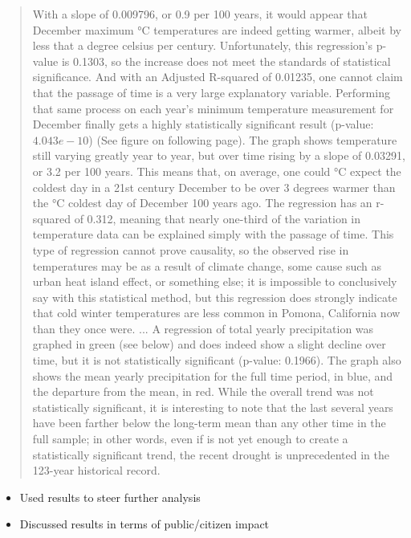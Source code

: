 \documentclass{article}\usepackage[]{graphicx}\usepackage[]{color}
\begin{document}
\begin{quote}
With a slope of 0.009796, or 0.9 per 100 years, it would appear that December maximum °C temperatures are indeed getting warmer, albeit by less that a degree celsius per century. Unfortunately, this regression’s p-value is 0.1303, so the increase does not meet the standards of statistical significance. And with an Adjusted R-squared of 0.01235, one cannot claim that the passage of time is a very large explanatory variable.
Performing that same process on each year’s minimum temperature measurement for December finally gets a highly statistically significant result (p-value: $4.043e-10$) (See figure on following page). The graph shows temperature still varying greatly year to year, but over time rising by a slope of 0.03291, or 3.2 per 100 years. This means that, on average, one could °C expect the coldest day in a 21st century December to be over 3 degrees warmer than the °C coldest day of December 100 years ago. The regression has an r-squared of 0.312, meaning that nearly one-third of the variation in temperature data can be explained simply with the passage of time. This type of regression cannot prove causality, so the observed rise in temperatures may be as a result of climate change, some cause such as urban heat island effect, or something else; it is impossible to conclusively say with this statistical method, but this regression does strongly indicate that cold winter temperatures are less common in Pomona, California now than they once were.
...
A regression of total yearly precipitation was graphed in green (see below) and does indeed show a slight decline over time, but it is not statistically significant (p-value: 0.1966). The graph also shows the mean yearly precipitation for the full time period, in blue, and the departure from the mean, in red. While the overall trend was not statistically significant, it is interesting to note that the last several years have been farther below the long-term mean than any other time in the full sample; in other words, even if is not yet enough to create a statistically significant trend, the recent drought is unprecedented in the 123-year historical record. 
\end{quote}
\begin{itemize}
  \item Used results to steer further analysis
  \item Discussed results in terms of public/citizen impact
\end{itemize}
\end{document}
